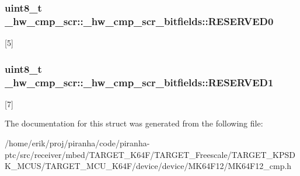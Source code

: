 \subsubsection[{\texorpdfstring{R\+E\+S\+E\+R\+V\+E\+D0}{RESERVED0}}]{\setlength{\rightskip}{0pt plus 5cm}uint8\+\_\+t \+\_\+hw\+\_\+cmp\+\_\+scr\+::\+\_\+hw\+\_\+cmp\+\_\+scr\+\_\+bitfields\+::\+R\+E\+S\+E\+R\+V\+E\+D0}\hypertarget{struct__hw__cmp__scr_1_1__hw__cmp__scr__bitfields_a4fa01d9d670306c6ac2350ba144ce83c}{}\label{struct__hw__cmp__scr_1_1__hw__cmp__scr__bitfields_a4fa01d9d670306c6ac2350ba144ce83c}
\mbox{[}5\mbox{]} 
\subsubsection[{\texorpdfstring{R\+E\+S\+E\+R\+V\+E\+D1}{RESERVED1}}]{\setlength{\rightskip}{0pt plus 5cm}uint8\+\_\+t \+\_\+hw\+\_\+cmp\+\_\+scr\+::\+\_\+hw\+\_\+cmp\+\_\+scr\+\_\+bitfields\+::\+R\+E\+S\+E\+R\+V\+E\+D1}\hypertarget{struct__hw__cmp__scr_1_1__hw__cmp__scr__bitfields_ae0fbf19003d65772028f3a9f6ed96a95}{}\label{struct__hw__cmp__scr_1_1__hw__cmp__scr__bitfields_ae0fbf19003d65772028f3a9f6ed96a95}
\mbox{[}7\mbox{]} 

The documentation for this struct was generated from the following file\+:\begin{DoxyCompactItemize}
\item 
/home/erik/proj/piranha/code/piranha-\/ptc/src/receiver/mbed/\+T\+A\+R\+G\+E\+T\+\_\+\+K64\+F/\+T\+A\+R\+G\+E\+T\+\_\+\+Freescale/\+T\+A\+R\+G\+E\+T\+\_\+\+K\+P\+S\+D\+K\+\_\+\+M\+C\+U\+S/\+T\+A\+R\+G\+E\+T\+\_\+\+M\+C\+U\+\_\+\+K64\+F/device/device/\+M\+K64\+F12/M\+K64\+F12\+\_\+cmp.\+h\end{DoxyCompactItemize}
